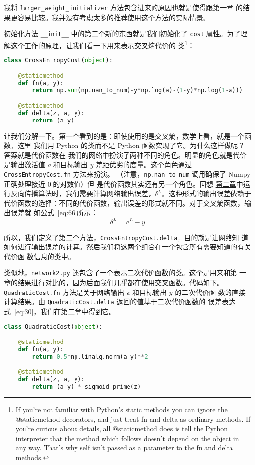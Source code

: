 我将 \lstinline!larger_weight_initializer! 方法包含进来的原因也就是使得跟第一章
的结果更容易比较。我并没有考虑太多的推荐使用这个方法的实际情景。

初始化方法 \lstinline!__init__! 中的第二个新的东西就是我们初始化了
\lstinline!cost! 属性。为了理解这个工作的原理，让我们看一下用来表示交叉熵代价的
类\footnote{If you're not familiar with Python's static methods you can ignore
  the @staticmethod decorators, and just treat fn and delta as ordinary
  methods. If you're curious about details, all @staticmethod does is tell the
  Python interpreter that the method which follows doesn't depend on the object
  in any way. That's why self isn't passed as a parameter to the fn and delta
  methods.}：
\begin{lstlisting}[language=Python]
class CrossEntropyCost(object):

    @staticmethod
    def fn(a, y):
        return np.sum(np.nan_to_num(-y*np.log(a)-(1-y)*np.log(1-a)))

    @staticmethod
    def delta(z, a, y):
        return (a-y)
\end{lstlisting}

让我们分解一下。第一个看到的是：即使使用的是交叉熵，数学上看，就是一个函数，这里
我们用 Python 的类而不是 Python 函数实现了它。为什么这样做呢？答案就是代价函数在
我们的网络中扮演了两种不同的角色。明显的角色就是代价是输出激活值 $a$ 和目标输出
$y$ 差距优劣的度量。这个角色通过 \lstinline!CrossEntropyCost.fn! 方法来扮演。
（注意，\lstinline!np.nan_to_num! 调用确保了 Numpy 正确处理接近 $0$ 的对数值）但
是代价函数其实还有另一个角色。回想%
\hyperref[sec:the_four_fundamental_equations_behind_backpropagation]{第二章}中运
行反向传播算法时，我们需要计算网络输出误差，$\delta^L$。这种形式的输出误差依赖于
代价函数的选择：不同的代价函数，输出误差的形式就不同。对于交叉熵函数，输出误差就
如公式~\eqref{eq:66}所示：
\begin{equation}
  \delta^L = a^L-y
  \label{eq:99}\tag{99}
\end{equation}

所以，我们定义了第二个方法，\lstinline!CrossEntropyCost.delta!，目的就是让网络知
道如何进行输出误差的计算。然后我们将这两个组合在一个包含所有需要知道的有关代价函
数信息的类中。

类似地，\lstinline!network2.py! 还包含了一个表示二次代价函数的类。这个是用来和第
一章的结果进行对比的，因为后面我们几乎都在使用交叉函数。代码如下。
\lstinline!QuadraticCost.fn! 方法是关于网络输出 $a$ 和目标输出 $y$ 的二次代价函
数的直接计算结果。由 \lstinline!QuadraticCost.delta! 返回的值基于二次代价函数的
误差表达式~\eqref{eq:30}，我们在第二章中得到它。
\begin{lstlisting}[language=Python]
class QuadraticCost(object):

    @staticmethod
    def fn(a, y):
        return 0.5*np.linalg.norm(a-y)**2

    @staticmethod
    def delta(z, a, y):
        return (a-y) * sigmoid_prime(z)
\end{lstlisting}

